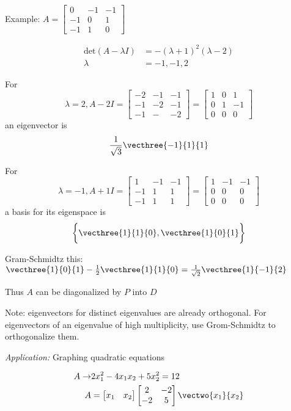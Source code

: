 \documentclass[12pt]{article}
\begin{document}

Example: $A = \begin{bmatrix}0&-1&-1\\-1&0&1\\-1&1&0\end{bmatrix}$

\begin{align*}
\text{det}(A-\lambda I) &= -(\lambda+1)^2(\lambda-2)\\
\lambda &= -1,-1,2
\end{align*}

For \[ \lambda = 2, A-2I = \begin{bmatrix}-2&-1&-1\\-1&-2&-1\\-1&-&-2\end{bmatrix} = \begin{bmatrix}1&0&1\\0&1&-1\\0&0&0\end{bmatrix} \] an eigenvector is \[ \frac{1}{\sqrt{3}}\vecthree{-1}{1}{1} \]

For \[ \lambda = -1, A+1I = \begin{bmatrix}1&-1&-1\\-1&1&1\\-1&1&1\end{bmatrix} = \begin{bmatrix}1&-1&-1\\0&0&0\\0&0&0\end{bmatrix} \] a basis for its eigenspace is \[ \bigg\{\vecthree{1}{1}{0},\vecthree{1}{0}{1}\bigg\} \]

Gram-Schmidtz this: $\vecthree{1}{0}{1} - \frac{1}{2}\vecthree{1}{1}{0} = \frac{1}{\sqrt{2}}\vecthree{1}{-1}{2}$

Thus $A$ can be diagonalized by $P$ into $D$

Note: eigenvectors for distinct eigenvalues are already orthogonal. For eigenvectors of an eigenvalue of high multiplicity, use Grom-Schmidtz to orthogonalize them.

\textit{Application:} Graphing quadratic equations

\begin{align*}
A \to& 2x_1^2 - 4x_1x_2 + 5x_2^2 = 12\\
A &= \begin{bmatrix}x_1&x_2\end{bmatrix}\begin{bmatrix}2&-2\\-2&5\end{bmatrix}\vectwo{x_1}{x_2}\\
\end{align*}
\end{document}
